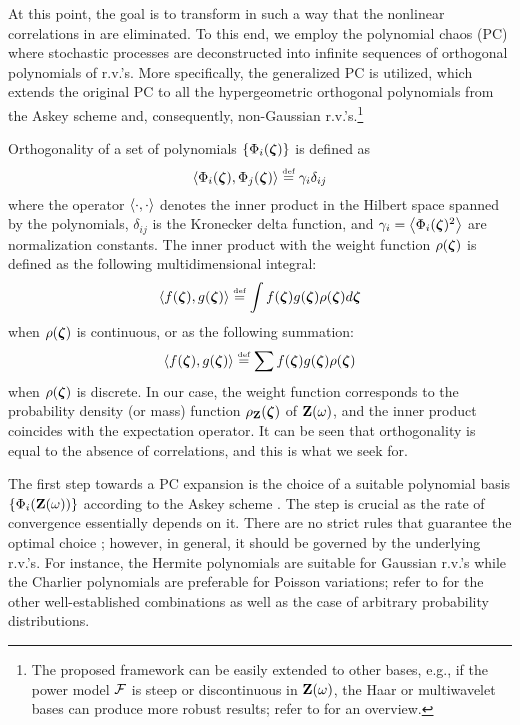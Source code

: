 At this point, the goal is to transform  in such a way that the nonlinear correlations in  are eliminated. To this end, we employ the polynomial chaos (PC) where stochastic processes are deconstructed into infinite sequences of orthogonal polynomials of r.v.'s. More specifically, the generalized PC \cite{xiu2002} is utilized, which extends the original PC \cite{ghanem1991} to all the hypergeometric orthogonal polynomials from the Askey scheme and, consequently, non-Gaussian r.v.'s.\footnote{The proposed framework can be easily extended to other bases, e.g., if the power model $\mathcal{F}$ is steep or discontinuous in $\mathbf{Z}(\omega)$, the Haar or multiwavelet bases can produce more robust results; refer to \cite{maitre2010} for an overview.}

Orthogonality of a set of polynomials $\{ \Phi_i(\boldsymbol{\zeta}) \}$ is defined as
\begin{equation} \elabel{orthogonality}
  \oInner{\pcb_i(\vz)}{\pcb_j(\vz)} \eqdef \pcn_i \delta_{ij}
\end{equation}
where the operator $\oInner{\idot}{\idot}$ denotes the inner product in the Hilbert space spanned by the polynomials, $\delta_{ij}$ is the Kronecker delta function, and $\pcn_i = \oInner{\pcb_i(\vz)^2}$ are normalization constants. The inner product with the weight function $\rho(\boldsymbol{\zeta})$ is defined as the following multidimensional integral:
\begin{equation} \elabel{inner-product-integral}
  \oInner{f(\vz)}{g(\vz)} \eqdef \int f(\vz) g(\vz) \PDF(\vz) d\vz
\end{equation}
when $\rho(\boldsymbol{\zeta})$ is continuous, or as the following summation:
\begin{equation} \elabel{inner-product-sum}
  \oInner{f(\vz)}{g(\vz)} \eqdef \sum f(\vz) g(\vz) \PDF(\vz)
\end{equation}
when $\rho(\boldsymbol{\zeta})$ is discrete. In our case, the weight function corresponds to the probability density (or mass) function $\rho_{\mathbf{Z}}(\boldsymbol{\zeta})$ of $\mathbf{Z}(\omega)$, and the inner product coincides with the expectation operator. It can be seen that orthogonality is equal to the absence of correlations, and this is what we seek for.

The first step towards a PC expansion is the choice of a suitable polynomial basis $\{ \Phi_i(\mathbf{Z}(\omega)) \}$ according to the Askey scheme \cite{xiu2002}. The step is crucial as the rate of convergence essentially depends on it. There are no strict rules that guarantee the optimal choice \cite{knio2006, maitre2010}; however, in general, it should be governed by the underlying r.v.'s. For instance, the Hermite polynomials are suitable for Gaussian r.v.'s while the Charlier polynomials are preferable for Poisson variations; refer to \cite{xiu2002} for the other well-established combinations as well as the case of arbitrary probability distributions.

